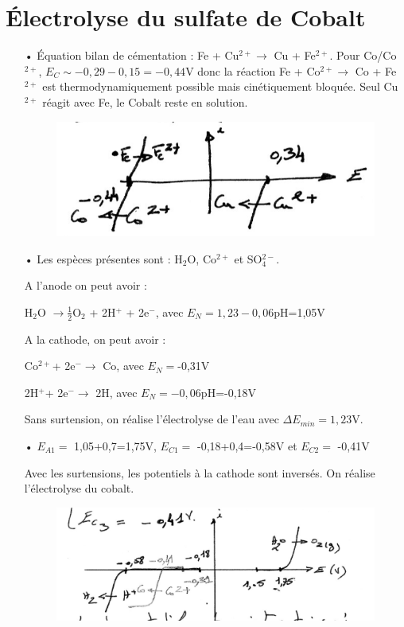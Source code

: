 \documentclass{report}
\begin{document}
\section*{Électrolyse du sulfate de Cobalt}

\begin{itemize}
	\item[•] Équation  bilan de cémentation : Fe + Cu$^{2+}\longrightarrow$ Cu + Fe$^{2+}$.
	Pour Co/Co$^{2+}$, $E_C\sim-0,29-0,15=-0,44$V donc la réaction Fe + Co$^{2+}\longrightarrow$ Co + Fe$^{2+}$ est thermodynamiquement possible mais cinétiquement bloquée. Seul Cu$^{2+}$ réagit avec Fe, le Cobalt reste en solution.
	\begin{figure}[!h]
	\centering
	\includegraphics[width=0.5\linewidth]{Chimie1.png}
	\end{figure}

	\item[•] Les espèces présentes sont : H$_2$O, Co$^{2+}$ et SO$_{4}^{2-}$.
	
	A l'anode on peut avoir :  
	
	H$_2$O $\longrightarrow\frac{1}{2}$O$_2$ + 2H$^+$ + 2e$^-$, avec $E_N=1,23-0,06$pH=1,05V
	
	A la cathode, on peut avoir : 
	
	 Co$^{2+}$+ 2e$^-\longrightarrow$ Co, avec $E_N=$-0,31V

	 2H$^{+}$+ 2e$^-\longrightarrow$ 2H, avec $E_N=-0,06$pH=-0,18V
	 
	 Sans surtension, on réalise l'électrolyse de l'eau avec $\Delta E_{min}=1,23$V.
	 
	 \item[•] $E_{A1} =$ 1,05+0,7=1,75V, $E_{C1} =$ -0,18+0,4=-0,58V et $E_{C2} =$ -0,41V
	 
	 Avec les surtensions, les potentiels à la cathode sont inversés. On réalise l'électrolyse du cobalt. 
	 \begin{figure}[!h]
	\centering
	\includegraphics[width=0.8\linewidth]{Chimie2.png}
	\end{figure}


\end{itemize}
\end{document}
